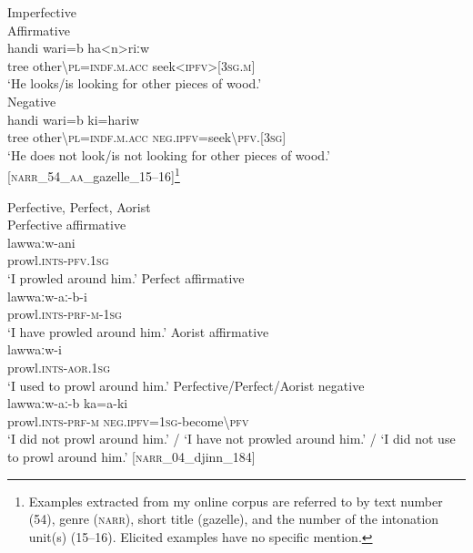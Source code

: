 \documentclass[output=paper,colorlinks,citecolor=brown]{langscibook}
\begin{document}
\ea\label{ex:beja:1}
Imperfective \\
    \ea\label{ex:beja:1a} Affirmative \\
        \gll handi wari=b ha<n>riːw\\
             tree other\textbackslash\textsc{pl=indf.m.acc} seek\textsc{<ipfv>}\textsc{[3sg.m]}\\
        \glt `He looks/is looking for other pieces of wood.' \\

    \ex\label{ex:beja:1b} Negative \\
        \gll handi wari=b ki=hariw\\
             tree other{\textbackslash}\textsc{pl=indf.m.acc} \textsc{neg.ipfv}=seek\textsc{{\textbackslash}pfv.\textsc[3sg]}\\
        \glt `He does not look/is not looking for other pieces of wood.' [\textsc{narr\_54\_aa}\_gazelle\_15–16]\footnote{Examples extracted from my online corpus are referred to by text number (54), genre (\textsc{narr}), short title (gazelle), and the number of the intonation unit(s) (15–16). Elicited examples have no specific mention.}
    \z
\z 

\ea\label{ex:beja:2}
Perfective, Perfect, Aorist \\
    \ea\label{ex:beja:2a} Perfective affirmative \\
        \gll lawwaːw-ani \\
          prowl\textsc{.ints}-\textsc{pfv.1sg} \\
        \glt `I prowled around him.'
    \ex\label{ex:beja:2b} Perfect affirmative\\
        \gll lawwaːw-aː-b-i\\
             prowl\textsc{.ints}-\textsc{prf-m-1sg}\\
        \glt `I have prowled around him.'
    \ex\label{ex:beja:2c} Aorist affirmative \\
        \gll lawwaːw-i\\
             prowl\textsc{.ints}-\textsc{aor.1sg}\\
        \glt `I used to prowl around him.'
    \ex\label{ex:beja:2d} Perfective/Perfect/Aorist negative\\
        \gll lawwaːw-aː-b ka=a-ki\\
             prowl\textsc{.ints}-\textsc{prf-m} \textsc{neg.ipfv=1sg-}become{\textbackslash}\textsc{pfv}\footnotemark{} \\
        \glt `I did not prowl around him.' / `I have not prowled around him.' / `I did not use to prowl around him.' [\textsc{narr}\_04\_djinn\_184]
    \z
\z 
\end{document}
